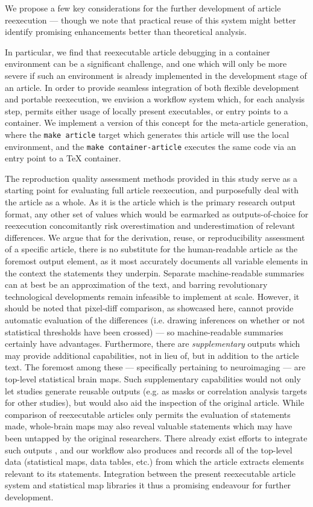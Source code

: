 We propose a few key considerations for the further development of article reexecution — though we note that practical reuse of this system might better identify promising enhancements better than theoretical analysis.

In particular, we find that reexecutable article debugging in a container environment can be a significant challenge, and one which will only be more severe if such an environment is already implemented in the development stage of an article.
In order to provide seamless integration of both flexible development and portable reexecution, we envision a workflow system which, for each analysis step, permits either usage of locally present executables, or entry points to a container.
We implement a version of this concept for the meta-article generation, where the \texttt{make article} target which generates this article will use the local environment, and the \texttt{make container-article} executes the same code via an entry point to a \TeX{} container.

The reproduction quality assessment methods provided in this study serve as a starting point for evaluating full article reexecution, and purposefully deal with the article as a whole.
As it is the article which is the primary research output format, any other set of values which would be earmarked as outputs-of-choice for reexecution concomitantly risk overestimation and underestimation of relevant differences.
We argue that for the derivation, reuse, or reproducibility assessment of a specific article, there is no substitute for the human-readable article as the foremost output element, as it most accurately documents all variable elements in the context the statements they underpin.
Separate machine-readable summaries can at best be an approximation of the text, and barring revolutionary technological developments remain infeasible to implement at scale.
However, it should be noted that pixel-diff comparison, as showcased here, cannot provide automatic evaluation of the differences (i.e. drawing inferences on whether or not statistical thresholds have been crossed) — so machine-readable summaries certainly have advantages.
Furthermore, there are \emph{supplementary} outputs which may provide additional capabilities, not in lieu of, but in addition to the article text.
The foremost among these — specifically pertaining to neuroimaging — are top-level statistical brain maps.
Such supplementary capabilities would not only let studies generate reusable outputs (e.g. as masks or correlation analysis targets for other studies), but would also aid the inspection of the original article.
While comparison of reexecutable articles only permits the evaluation of statements made, whole-brain maps may also reveal valuable statements which may have been untapped by the original researchers.
There already exist efforts to integrate such outputs \cite{nidm}, and our workflow also produces and records all of the top-level data (statistical maps, data tables, etc.) from which the article extracts elements relevant to its statements.
Integration between the present reexecutable article system and statistical map libraries it thus a promising endeavour for further development.

